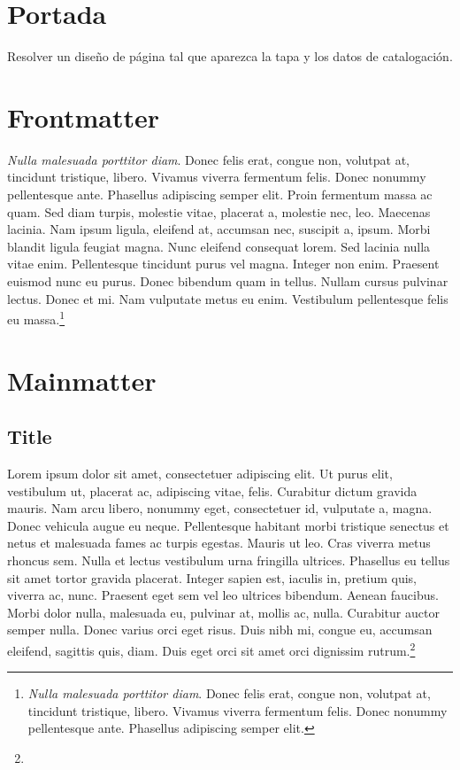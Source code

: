 \documentclass{book}
\begin{document}
\frontmatter

\tableofcontents

\chapter{Portada}

Resolver un diseño de página tal que aparezca la tapa y los datos de catalogación.

\chapter{Frontmatter}

\lipsum[1]

\emph{Nulla malesuada porttitor diam}. Donec felis erat, congue non, volutpat at, tincidunt tristique, libero. Vivamus viverra fermentum felis. Donec nonummy pellentesque ante. Phasellus adipiscing semper elit. Proin fermentum massa ac quam. Sed diam turpis, molestie vitae, placerat a, molestie nec, leo. Maecenas lacinia. Nam ipsum ligula, eleifend at, accumsan nec, suscipit a, ipsum. Morbi blandit ligula feugiat magna. Nunc eleifend consequat lorem. Sed lacinia nulla vitae enim. Pellentesque tincidunt purus vel magna. Integer non enim. Praesent euismod nunc eu purus. Donec bibendum quam in tellus. Nullam cursus pulvinar lectus. Donec et mi. Nam vulputate metus eu enim. Vestibulum pellentesque felis eu massa.\footnote{\emph{Nulla malesuada porttitor diam}. Donec felis erat, congue non, volutpat at, tincidunt tristique, libero. Vivamus viverra fermentum felis. Donec nonummy pellentesque ante. Phasellus adipiscing semper elit.}

\lipsum[1]

\mainmatter

\chapter{Mainmatter}
\label{mychapter}

\lipsum[1]

\section{Title}

Lorem ipsum dolor sit amet, consectetuer adipiscing elit. Ut purus elit, vestibulum ut, placerat ac, adipiscing vitae, felis. Curabitur dictum gravida mauris. Nam arcu libero, nonummy eget, consectetuer id, vulputate a, magna. Donec vehicula augue eu neque. Pellentesque habitant morbi tristique senectus et netus et malesuada fames ac turpis egestas. Mauris ut leo. Cras viverra metus rhoncus sem. Nulla et lectus vestibulum urna fringilla ultrices. Phasellus eu tellus sit amet tortor gravida placerat. Integer sapien est, iaculis in, pretium quis, viverra ac, nunc. Praesent eget sem vel leo ultrices bibendum. Aenean faucibus. Morbi dolor nulla, malesuada eu, pulvinar at, mollis ac, nulla. Curabitur auctor semper nulla. Donec varius orci eget risus. Duis nibh mi, congue eu, accumsan eleifend, sagittis quis, diam. Duis eget orci sit amet orci dignissim rutrum.\footnote{\lipsum[3]}
\end{document}
